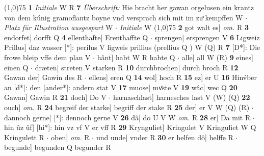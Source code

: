\documentclass[8pt,a4paper,notitlepage]{article}
\begin{document}
\begin{table}[ht]
\begin{minipage}[t]{0.5\linewidth}
\line(1,0){75} \newline
\textbf{1} \textit{Initiale} W R  \textbf{7} \textit{Überschrift:} Hie bracht her gawan orgelusen ein krantz von dem kúnig gramoflantz boyne vnd versprach sich mit im zuͦ kempffen W   $\cdot$ \textit{Platz für Illustration ausgespart} W   $\cdot$ \textit{Initiale} W  \newline
\line(1,0){75} \newline
\textbf{2} got walt es] \textit{om.} R \textbf{3} endorfet] dorfft Q \textbf{4} ellenthafte] Erenthaffte Q  $\cdot$ sprengen] ersprengen V \textbf{6} Ligweiz Prillus] daz wasser [*]: perilus V ligweis prillius (prellius Q ) W (Q) R \textbf{7} [D*]: Die frowe bleip vffe dem plan V  $\cdot$ hânt] habt W R habte Q  $\cdot$ alle] all W (R) \textbf{9} eines] einen Q  $\cdot$ dræten] streten V starken R \textbf{10} durchbrochen] durch broch R \textbf{12} Gawan der] Gawin des R  $\cdot$ ellens] eren Q \textbf{14} wol] hoch R \textbf{15} ez] er U \textbf{16} Hinv́ber an [d*]: den [ander*]: andern stat V \textbf{17} muose] mvͤste V \textbf{19} wâc] wec Q \textbf{20} Gawan] Gawin R \textbf{21} doch] Do V  $\cdot$ harnaschlast] harnesches last V (W) (Q) \textbf{22} ouch] \textit{om.} R \textbf{24} begreif der starke] begriff der stake R \textbf{25} der] er V W (Q) (R)  $\cdot$ dannoch gerne] [*]: dennoch gerne V \textbf{26} dâ] do U V W \textit{om.} R \textbf{28} er] Da mit R  $\cdot$ hin ûz ûf] [hi*]: hin vz vf V er vff R \textbf{29} Krynguliet] Kringulet V Kringuliet W Q Kringulett R  $\cdot$ oben] \textit{om.} R  $\cdot$ und unde] vnder R \textbf{30} er helfen dô] helffe R  $\cdot$ begunde] begunden Q begunder R \newline
\end{minipage}
\end{table}
\end{document}
